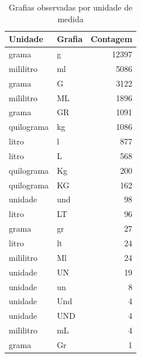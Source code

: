 \begin{table}[htbp]
\centering
\caption{Grafias observadas por unidade de medida}
\label{tab:formas-unidade}
\small
\begin{tabular}{llr}
\toprule
Unidade & Grafia & Contagem \\
\midrule
grama & g & 12397 \\
mililitro & ml & 5086 \\
grama & G & 3122 \\
mililitro & ML & 1896 \\
grama & GR & 1091 \\
quilograma & kg & 1086 \\
litro & l & 877 \\
litro & L & 568 \\
quilograma & Kg & 200 \\
quilograma & KG & 162 \\
unidade & und & 98 \\
litro & LT & 96 \\
grama & gr & 27 \\
litro & lt & 24 \\
mililitro & Ml & 24 \\
unidade & UN & 19 \\
unidade & un & 8 \\
unidade & Und & 4 \\
unidade & UND & 4 \\
mililitro & mL & 4 \\
grama & Gr & 1 \\
\bottomrule
\end{tabular}
\vspace{2mm}
\end{table}
